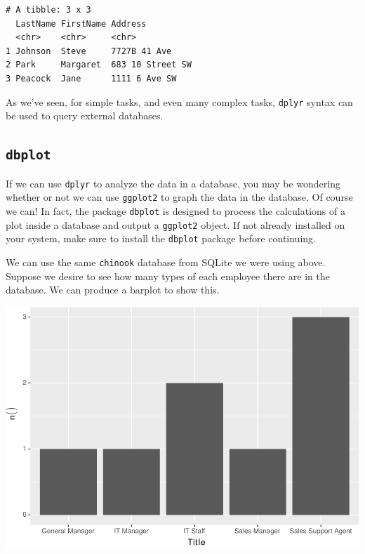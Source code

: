 \documentclass[]{krantz}
\makeatletter
\newenvironment{Shaded}{\begin{snugshade}}{\end{snugshade}}
\newcommand{\KeywordTok}[1]{\textcolor[rgb]{0.27,0.27,0.27}{\textbf{#1}}}
\newcommand{\NormalTok}[1]{#1}
\newcommand{\OperatorTok}[1]{\textcolor[rgb]{0.43,0.43,0.43}{\textbf{#1}}}
\newcommand{\StringTok}[1]{\textcolor[rgb]{0.5,0.5,0.5}{#1}}
\newenvironment{kframe}{%
\medskip{}
\setlength{\fboxsep}{.8em}
 \def\at@end@of@kframe{}%
 \ifinner\ifhmode%
  \def\at@end@of@kframe{\end{minipage}}%
  \begin{minipage}{\columnwidth}%
 \fi\fi%
 \def\FrameCommand##1{\hskip\@totalleftmargin \hskip-\fboxsep
 \colorbox{shadecolor}{##1}\hskip-\fboxsep
     \hskip-\linewidth \hskip-\@totalleftmargin \hskip\columnwidth}%
 \MakeFramed {\advance\hsize-\width
   \@totalleftmargin\z@ \linewidth\hsize
   \@setminipage}}%
 {\par\unskip\endMakeFramed%
 \at@end@of@kframe}
\renewenvironment{Shaded}{\begin{kframe}}{\end{kframe}}
\makeatother
\begin{document}
\begin{verbatim}
# A tibble: 3 x 3
  LastName FirstName Address         
  <chr>    <chr>     <chr>           
1 Johnson  Steve     7727B 41 Ave    
2 Park     Margaret  683 10 Street SW
3 Peacock  Jane      1111 6 Ave SW   
\end{verbatim}

As we've seen, for simple tasks, and even many complex tasks, \texttt{dplyr} syntax can be used to query external databases.

\hypertarget{dbplot}{%
\subsection{\texorpdfstring{\texttt{dbplot}}{dbplot}}\label{dbplot}}

If we can use \texttt{dplyr} to analyze the data in a database, you may be wondering whether or not we can use \texttt{ggplot2} to graph the data in the database. Of course we can! In fact, the package \texttt{dbplot} is designed to process the calculations of a plot inside a database and output a \texttt{ggplot2} object. If not already installed on your system, make sure to install the \texttt{dbplot} package before continuing.

We can use the same \texttt{chinook} database from SQLite we were using above. Suppose we desire to see how many types of each employee there are in the database. We can produce a barplot to show this.

\begin{Shaded}
\end{Shaded}

\includegraphics{bookdown_files/figure-latex/unnamed-chunk-298-1.pdf}
\end{document}
